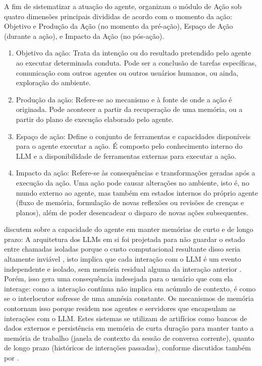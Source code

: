 \documentclass[12pt,oneside,a4paper,brazil,sumario=tradicional]{abntex2}
\begin{document}
A fim de sistematizar a atuação do agente,  organizam o módulo de Ação sob quatro dimensões principais divididas de acordo com o momento da ação: Objetivo e Produção da Ação (no momento da pré-ação), Espaço de Ação (durante a ação), e Impacto da Ação (no pós-ação).

\begin{enumerate}
  \item Objetivo da ação: Trata da intenção ou do resultado pretendido pelo agente ao executar determinada conduta. Pode ser a conclusão de tarefas específicas, comunicação com outros agentes ou outros usuários humanos, ou ainda, exploração do ambiente.
  \item Produção da ação: Refere-se ao mecanismo e à fonte de onde a ação é originada. Pode acontecer a partir da recuperação de uma memória, ou a partir do plano de execução elaborado pelo agente.
  \item Espaço de ação: Define o conjunto de ferramentas e capacidades disponíveis para o agente executar a ação. É composto pelo conhecimento interno do LLM e a disponibilidade de ferramentas externas para executar a ação.
  \item Impacto da ação: Refere-se às consequências e transformações geradas após a execução da ação. Uma ação pode causar alterações no ambiente, isto é, no mundo externo ao agente, mas também em estados internos do próprio agente (fluxo de memória, formulação de novas reflexões ou revisões de crenças e planos), além de poder desencadear o disparo de novas ações subsequentes.
\end{enumerate}
 discutem sobre a capacidade do agente em manter memórias de curto e de longo prazo: A arquitetura dos LLMs em si foi projetada para não guardar o estado entre chamadas isoladas porque o custo computacional resultante disso seria altamente inviável \cite{oren2024}, isto implica que cada interação com o LLM é um evento independente e isolado, sem memória residual alguma da interação anterior \cite{tang2026}. Porém, isso gera uma consequência indesejada para o usuário que com ela interage: como a interação contínua não implica em acúmulo de contexto, é como se o interlocutor sofresse de uma amnésia constante. Os mecanismos de memória contornam isso porque residem nos agentes e servidores que encapsulam as interações com o LLM. Estes sistemas se utilizam de artifícios como bancos de dados externos e persistência em memória de curta duração para manter tanto a memória de trabalho (janela de contexto da sessão de conversa corrente), quanto de longo prazo (históricos de interações passadas), conforme discutidos também por .
\end{document}
